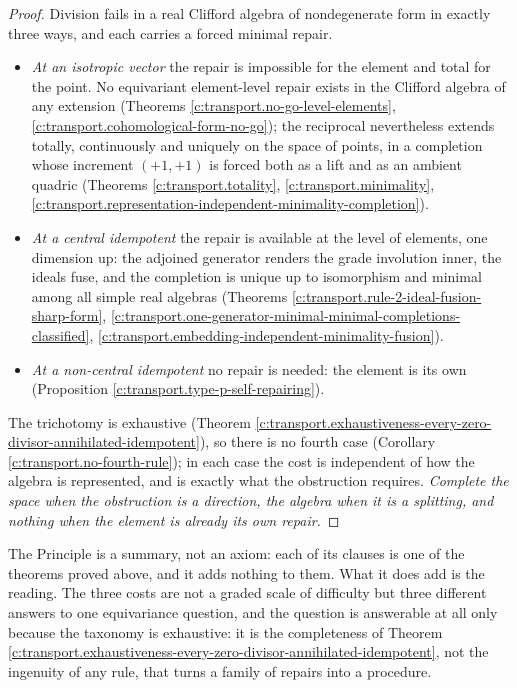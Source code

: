 \documentclass[11pt]{article}
\theoremstyle{definition}
\theoremstyle{plain}
\begin{document}
\begin{proof}
Division fails in a real Clifford algebra of nondegenerate form in exactly three ways, and each carries a forced minimal repair.
\begin{itemize}
\item \emph{At an isotropic vector} the repair is impossible for the element and total for the point. No equivariant element-level repair exists in the Clifford algebra of any extension (Theorems \ref{c:transport.no-go-level-elements}, \ref{c:transport.cohomological-form-no-go}); the reciprocal nevertheless extends totally, continuously and uniquely on the space of points, in a completion whose increment $(+1,+1)$ is forced both as a lift and as an ambient quadric (Theorems \ref{c:transport.totality}, \ref{c:transport.minimality}, \ref{c:transport.representation-independent-minimality-completion}).
\item \emph{At a central idempotent} the repair is available at the level of elements, one dimension up: the adjoined generator renders the grade involution inner, the ideals fuse, and the completion is unique up to isomorphism and minimal among all simple real algebras (Theorems \ref{c:transport.rule-2-ideal-fusion-sharp-form}, \ref{c:transport.one-generator-minimal-minimal-completions-classified}, \ref{c:transport.embedding-independent-minimality-fusion}).
\item \emph{At a non-central idempotent} no repair is needed: the element is its own (Proposition \ref{c:transport.type-p-self-repairing}).
\end{itemize}
The trichotomy is exhaustive (Theorem \ref{c:transport.exhaustiveness-every-zero-divisor-annihilated-idempotent}), so there is no fourth case (Corollary \ref{c:transport.no-fourth-rule}); in each case the cost is independent of how the algebra is represented, and is exactly what the obstruction requires. \emph{Complete the space when the obstruction is a direction, the algebra when it is a splitting, and nothing when the element is already its own repair.}

\end{proof}

\label{c:note.transport.setting-transport-principle-algorithm}
The Principle is a summary, not an axiom: each of its clauses is one of the theorems proved above, and it adds nothing to them. What it does add is the reading. The three costs are not a graded scale of difficulty but three different answers to one equivariance question, and the question is answerable at all only because the taxonomy is exhaustive: it is the completeness of Theorem \ref{c:transport.exhaustiveness-every-zero-divisor-annihilated-idempotent}, not the ingenuity of any rule, that turns a family of repairs into a procedure.
\end{document}
